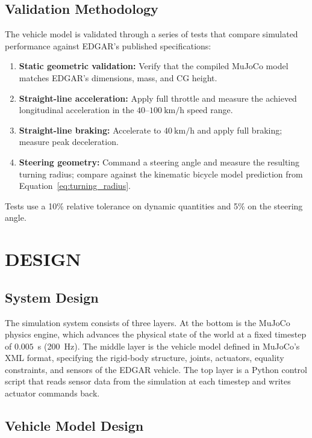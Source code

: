 \documentclass[a4paper,12pt]{report}
\begin{document}
\section{Validation Methodology}

The vehicle model is validated through a series of tests that compare simulated
performance against EDGAR's published specifications:

\begin{enumerate}
  \item \textbf{Static geometric validation:} Verify that the compiled MuJoCo
        model matches EDGAR's dimensions, mass, and CG height.
  \item \textbf{Straight-line acceleration:} Apply full throttle and measure
        the achieved longitudinal acceleration in the $40$–$100\ \text{km/h}$
        speed range.
  \item \textbf{Straight-line braking:} Accelerate to $40\ \text{km/h}$ and
        apply full braking; measure peak deceleration.
  \item \textbf{Steering geometry:} Command a steering angle and measure the
        resulting turning radius; compare against the kinematic bicycle model
        prediction from Equation~\ref{eq:turning_radius}.
\end{enumerate}

Tests use a 10\% relative tolerance on dynamic quantities and 5\% on the
steering angle.

\chapter{DESIGN}
\label{ch:design}

\section{System Design}

The simulation system consists of three layers. At the bottom is the MuJoCo
physics engine, which advances the physical state of the world at a fixed
timestep of $0.005$~s (200~Hz). The middle layer is the vehicle model defined
in MuJoCo's XML format, specifying the rigid-body structure, joints, actuators,
equality constraints, and sensors of the EDGAR vehicle. The top layer is a
Python control script that reads sensor data from the simulation at each
timestep and writes actuator commands back.

\section{Vehicle Model Design}
\end{document}
